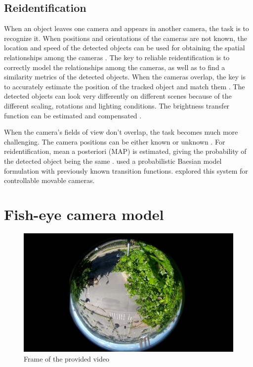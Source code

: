 \documentclass[a4paper,12pt,titlepage]{article}
\numberwithin{figure}{section}
\begin{document}
\subsection{Reidentification}
When an object leaves one camera and appears in another camera, the task is to recognize it. When positions and orientations of the cameras are not known, the location and speed of the detected objects can be used for obtaining the spatial relationships among the cameras \cite{makris2004bridging}. The key to reliable reidentification is to correctly model the relationships among the cameras, as well as to find a similarity metrics of the detected objects. When the cameras overlap, the key is to accurately estimate the position of the tracked object and match them \cite{khan2003consistent, krumm2000multi, zhao2005real}. The detected objects can look very differently on different scenes because of the different scaling, rotations and lighting conditions. The brightness transfer function can be estimated and compensated \cite{javed2005appearance, porikli2003inter}. 

When the camera's fields of view don't overlap, the task becomes much more challenging. The camera positions can be either known \cite{rahimi2004simultaneous} or unknown \cite{makris2004bridging}. For reidentification, mean a posteriori (MAP) is estimated, giving the probability of the detected object being the same \cite{javed2005appearance, huang1997object}. \cite{kettnaker1999bayesian} used a probabilistic Baesian model formulation with previously known transition functions. \cite{kang2003continuous} explored this system for controllable movable cameras. 




\section{Fish-eye camera model}
\label{sec:lens}

\begin{figure}[h]
\centering
\includegraphics[width=1\linewidth]{fig/stream1.png}
\caption{Frame of the provided video}
\label{fig:stream1}
\end{figure}
\end{document}
